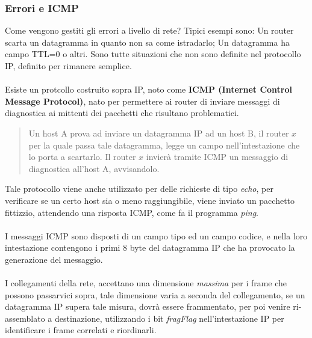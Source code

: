 \documentclass[12pt, letterpaper]{article}
\newcommand{\acc}{\\\hphantom{}\\}
\begin{document}
\subsubsection{Errori e ICMP}
Come vengono gestiti gli errori a livello di rete? Tipici esempi sono: Un router scarta un datagramma in quanto non sa 
come istradarlo; Un datagramma ha campo TTL=0 o altri. Sono tutte situazioni che non sono definite nel protocollo IP, 
definito per rimanere semplice.\acc 
Esiste un protcollo costruito sopra IP, noto come \textbf{ICMP (Internet Control Message Protocol)}, nato per permettere 
ai router di inviare messaggi di diagnostica ai mittenti dei pacchetti che risultano problematici.\begin{quote}
    Un host A prova ad inviare un datagramma IP ad un host B, il router $x$ per la quale passa tale datagramma, legge 
    un campo nell'intestazione che lo porta a scartarlo. Il router $x$ invierà tramite ICMP un messaggio di diagnostica all'host 
    A, avvisandolo.
\end{quote}
Tale protocollo viene anche utilizzato per delle richieste di tipo \textit{echo}, per verificare se un certo host 
sia o meno raggiungibile, viene inviato un pacchetto fittizzio, attendendo una risposta ICMP, come fa il programma 
\textit{ping}.\acc 
I messaggi ICMP sono disposti di un campo tipo ed un campo codice, e nella loro intestazione contengono i primi 8 
byte del datagramma IP che ha provocato la generazione del messaggio.\acc 
I collegamenti della rete, accettano una dimensione \textit{massima} per i frame che possono passarvici sopra, tale dimensione 
varia a seconda del collegamento, se un datagramma IP supera tale misura, dovrà essere frammentato, per poi venire 
ri-assemblato a destinazione, utilizzando i bit \textit{fragFlag} nell'intestazione IP per identificare i frame correlati e riordinarli.
\end{document}
